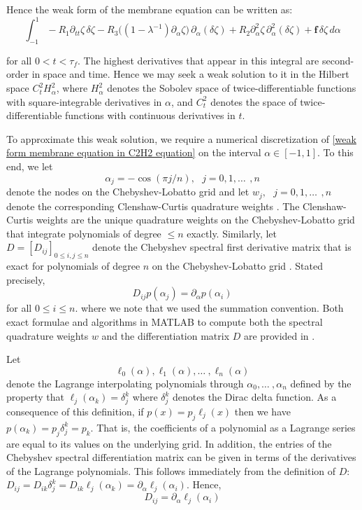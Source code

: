 \documentclass{article}[12pt]
\theoremstyle{Theorem}
\begin{document}
Hence the weak form of the membrane equation can be written as:
\begin{equation}
\int_{-1}^1-R_1
\partial_{tt}\zeta\, \delta\zeta 
-R_3\big((1-\lambda^{-1})\partial_\alpha\zeta\big)\, \partial_\alpha(\delta\zeta) + R_2\partial_\alpha^2\zeta\, \partial_\alpha^2(\delta\zeta) 
+\boldsymbol{f}\, \delta\zeta \,d\alpha
\label{weak form membrane equation in C2H2 equation}
\end{equation}

for all $0<t <\tau_f$. The highest derivatives that appear in this integral are second-order in space and time. Hence we may seek a weak solution to it in the Hilbert space $C^2_tH^2_\alpha$, where $H^2_\alpha$ denotes the Sobolev space of twice-differentiable functions with square-integrable derivatives in $\alpha$, and $C^2_t$ denotes the space of twice-differentiable functions with continuous derivatives in $t$.
\newline 

To approximate this weak solution, we require a numerical discretization of \eqref{weak form membrane equation in C2H2 equation} on the interval $\alpha \in [-1,1]$. To this end, we let $$\alpha_j = -\cos(\pi j/n),\text{ } j = 0,1,\ldots\,\ ,n$$
denote the nodes on the Chebyshev-Lobatto grid and let $w_j ,\text{ } j = 0,1,\ldots\,\ ,n$ denote the corresponding Clenshaw-Curtis quadrature weights \cite{trefethen2008gauss,trefethen2000spectral}. The Clenshaw-Curtis weights are the unique quadrature weights on the Chebyshev-Lobatto grid that integrate polynomials of degree $\leq n$ exactly. Similarly, let $D = [D_{ij}]_{0 \leq i,j \leq n}$ denote the Chebyshev spectral first derivative matrix that is exact for polynomials of degree $n$ on the Chebyshev-Lobatto grid \cite{trefethen2000spectral}. Stated precisely, $$D_{ij}p(\alpha_j) =\partial_\alpha p(\alpha_i)$$
 for all $0\leq i\leq n$. where we note that we used the summation convention. Both exact formulae and algorithms in MATLAB to compute both the spectral quadrature weights $w$ and the differentiation matrix $D$ are provided in \cite{trefethen2000spectral}.
\newline

Let $$\ell_0(\alpha),\ell_1(\alpha),\ldots\ , \ell_n(\alpha)$$ denote the Lagrange interpolating polynomials through $\alpha_0,\ldots\ ,\alpha_n$ defined by the property that $\ell_j(\alpha_k) =\delta_j^k$ where $\delta^k_j$ denotes the Dirac delta function. As a consequence of this definition, if $p(x) = p_j\ell_j(x)$ then we have $p(\alpha_k) = p_j\delta_j^k = p_k$. That is, the coefficients of a polynomial as a Lagrange series are equal to its values on the underlying grid. In addition, the entries of the Chebyshev spectral differentiation matrix can be given in terms of the derivatives of the Lagrange polynomials. This follows immediately from the definition of $D$: $D_{ij} = D_{ik}\delta^k_{j}=D_{ik}\ell_j(\alpha_k) =\partial_\alpha \ell_j(\alpha_i)$. Hence, $$D_{ij} = \partial_\alpha\ell_j(\alpha_i)$$
\end{document}
